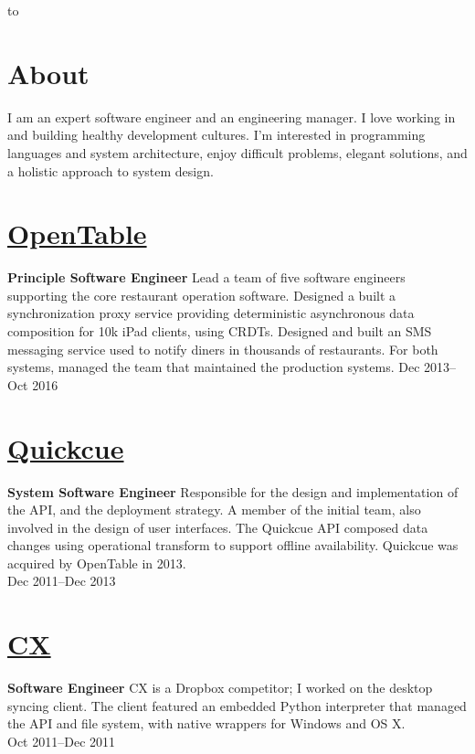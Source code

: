 \documentclass[margin]{res}
\begin{document}

\hbox to 

\begin{resume}
\section{About}

I am an expert software engineer and an engineering manager. I love
working in and building healthy development cultures. I'm interested
in programming languages and system architecture, enjoy difficult
problems, elegant solutions, and a holistic approach to system design.

\section{\href{https://opentable.com/}{OpenTable}}
{\bf Principle Software Engineer}
%
Lead a team of five software engineers supporting the core restaurant
operation software. Designed a built a synchronization proxy service
providing deterministic asynchronous data composition for 10k iPad
clients, using CRDTs. Designed and built an SMS messaging service used
to notify diners in thousands of restaurants. For both systems,
managed the team that maintained the production systems.
%
Dec 2013--Oct 2016

\section{\href{https://quickcue.com/}{Quickcue}}
{\bf System Software Engineer}
%
Responsible for the design and implementation of the API, and the
deployment strategy. A member of the initial team, also involved in
the design of user interfaces. The Quickcue API composed data changes
using operational transform to support offline availability. Quickcue
was acquired by OpenTable in 2013.\\
%
Dec 2011--Dec 2013

\section{\href{https://www.cx.com/}{CX}}
{\bf Software Engineer}
%
CX is a Dropbox competitor; I worked on the desktop syncing client.
The client featured an embedded Python interpreter that managed the
API and file system, with native wrappers for Windows and OS X.\\
%
Oct 2011--Dec 2011


\end{resume}
\end{document}
